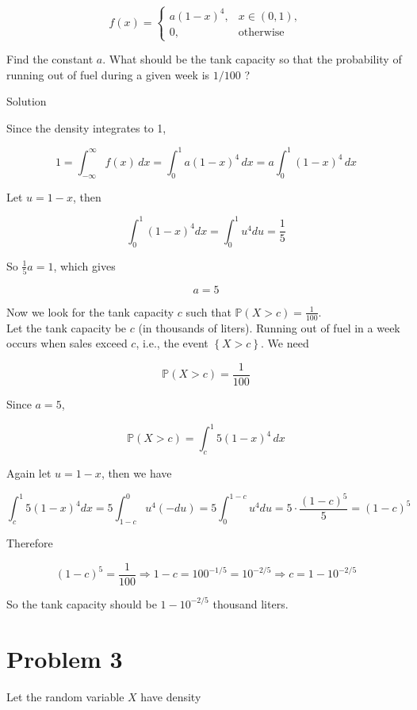 \documentclass{qlnotes-export}
\begin{document}
\[f(x) = \left\{ \begin{matrix}
{a(1 - x)^{4},} & {x \in (0,1),} \\
{0,} & \text{otherwise}
\end{matrix} \right.\]

Find the constant \(a\). What should be the tank capacity so that the probability of running out of fuel during a given week is \(1/100\) ?

\begin{qlsolution}{Solution}

Since the density integrates to 1,

\[1 = \int_{- \infty}^{\infty}f(x)\, dx = \int_{0}^{1}a(1 - x)^{4}\, dx = a\int_{0}^{1}(1 - x)^{4}\, dx\]

Let \(u = 1 - x\), then

\[\int_{0}^{1}(1 - x)^{4}dx = \int_{0}^{1}u^{4}du = \frac{1}{5}\]

So \(\frac{1}{5}a = 1\), which gives

\[a = 5\]

Now we look for the tank capacity \(c\) such that \({\mathbb{P}}(X > c) = \frac{1}{100}\).\\
Let the tank capacity be \(c\) (in thousands of liters). Running out of fuel in a week occurs when sales exceed \(c\), i.e., the event \(\left\{ {X > c} \right\}\). We need

\[{\mathbb{P}}(X > c) = \frac{1}{100}\]

Since \(a = 5\),

\[{\mathbb{P}}(X > c) = \int_{c}^{1}5(1 - x)^{4}\, dx\]

Again let \(u = 1 - x\), then we have

\[\int_{c}^{1}5(1 - x)^{4}dx = 5\int_{1 - c}^{0}u^{4}( - du) = 5\int_{0}^{1 - c}u^{4}du = 5 \cdot \frac{(1 - c)^{5}}{5} = (1 - c)^{5}\]

Therefore

\[(1 - c)^{5} = \frac{1}{100}\Longrightarrow 1 - c = 100^{- 1/5} = 10^{- 2/5}\Longrightarrow c = 1 - 10^{- 2/5}\]

So the tank capacity should be \(1 - 10^{- 2/5}\) thousand liters.

\end{qlsolution}

\section{Problem 3}\label{problem-3-2}

Let the random variable \(X\) have density
\end{document}
